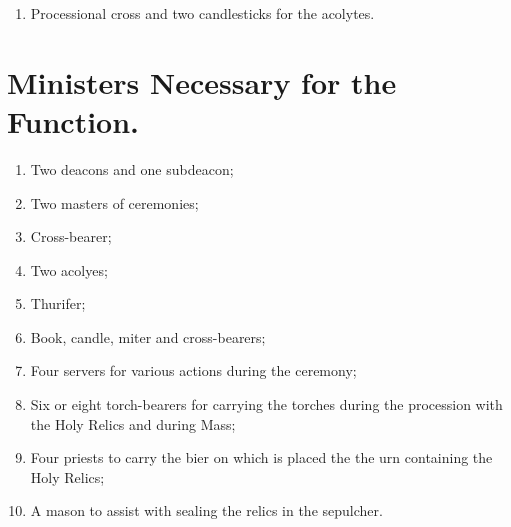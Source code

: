 \documentclass[letterpaper]{report}
\begin{document}
{\begin{enumerate}[label=\Roman*.]
\begin{enumerate}[label=\arabic*.]
                \item Processional cross and two candlesticks for the acolytes.

            \end{enumerate}

    \end{enumerate}

    \section{Ministers Necessary for the Function.}

    \begin{enumerate}[label=\Roman*.]

        \item Two deacons and one subdeacon;

        \item Two masters of ceremonies;

        \item Cross-bearer;

        \item Two acolyes;

        \item Thurifer;

        \item Book, candle, miter and cross-bearers;

        \item Four servers for various actions during the ceremony;

        \item Six or eight torch-bearers for carrying the torches during the
            procession with the Holy Relics and during Mass;

        \item Four priests to carry the bier on which is placed the the urn
            containing the Holy Relics;

        \item A mason to assist with sealing the relics in the sepulcher.

    \end{enumerate}

}
\end{document}
